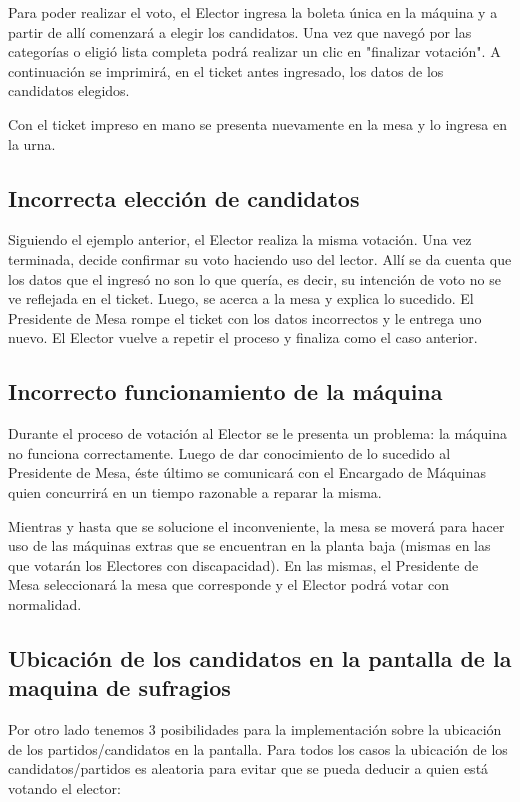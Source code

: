 \documentclass[spanish, 10pt,a4paper]{article}
\numberwithin{equation}{section} %
\begin{document}
	Para poder realizar el voto, el Elector ingresa la boleta única en la máquina y a partir de allí comenzará a elegir los candidatos. Una vez que navegó por las categorías o eligió lista completa podrá  realizar un clic en "finalizar votación". A continuación se imprimirá, en el ticket antes ingresado, los datos de los candidatos elegidos. 

	Con el ticket impreso en mano se presenta nuevamente en la mesa y lo ingresa en la urna.	
	
\subsection{Incorrecta elección de candidatos}
	Siguiendo el ejemplo anterior, el Elector realiza la misma votación. Una vez terminada, decide confirmar su voto haciendo uso del lector. Allí se da cuenta que los datos que el ingresó no son lo que quería, es decir, su intención de voto no se ve reflejada en el ticket. Luego, se acerca a la mesa y explica lo sucedido. El Presidente de Mesa rompe el ticket con los datos incorrectos y le entrega uno nuevo. El Elector vuelve a repetir el proceso y finaliza como el caso anterior. 

\subsection{Incorrecto funcionamiento de la máquina}
	Durante el proceso de votación al Elector se le presenta un problema: la máquina no funciona correctamente. Luego de dar conocimiento de lo sucedido al Presidente de Mesa, éste último se comunicará con el Encargado de Máquinas quien concurrirá en un tiempo razonable a reparar la misma. 
	
	Mientras y hasta que se solucione el inconveniente, la mesa se moverá para hacer uso de las máquinas extras que se encuentran en la planta baja  (mismas en las que votarán los Electores con discapacidad). En las mismas,  el Presidente de Mesa seleccionará la mesa que corresponde y el Elector podrá votar con normalidad.

\subsection{Ubicación de los candidatos en la pantalla de la maquina de sufragios}
Por otro lado tenemos 3 posibilidades para la implementación sobre la ubicación de los partidos/candidatos en la pantalla. Para todos los casos la ubicación de los candidatos/partidos es aleatoria para evitar que se pueda deducir a quien está votando el elector:
\end{document}
